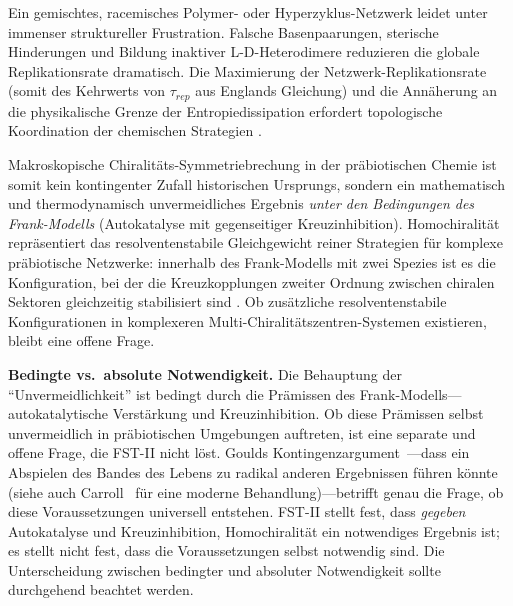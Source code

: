 \documentclass[12pt,a4paper]{article}
\theoremstyle{remark}
\begin{document}
Ein gemischtes, racemisches Polymer- oder Hyperzyklus-Netzwerk leidet unter immenser struktureller Frustration. Falsche Basenpaarungen, sterische Hinderungen und Bildung inaktiver L-D-Heterodimere reduzieren die globale Replikationsrate dramatisch. Die Maximierung der Netzwerk-Replikationsrate (somit des Kehrwerts von $\tau_{rep}$ aus Englands Gleichung) und die Ann\"aherung an die physikalische Grenze der Entropiedissipation erfordert topologische Koordination der chemischen Strategien \citep{Biochirality}.

Makroskopische Chiralit\"ats-Symmetriebrechung in der pr\"abiotischen Chemie ist somit kein kontingenter Zufall historischen Ursprungs, sondern ein mathematisch und thermodynamisch unvermeidliches Ergebnis \emph{unter den Bedingungen des Frank-Modells} (Autokatalyse mit gegenseitiger Kreuzinhibition). Homochiralit\"at repr\"asentiert das resolventenstabile Gleichgewicht reiner Strategien f\"ur komplexe pr\"abiotische Netzwerke: innerhalb des Frank-Modells mit zwei Spezies ist es die Konfiguration, bei der die Kreuzkopplungen zweiter Ordnung zwischen chiralen Sektoren gleichzeitig stabilisiert sind \citep{Biochirality}. Ob zus\"atzliche resolventenstabile Konfigurationen in komplexeren Multi-Chiralit\"atszentren-Systemen existieren, bleibt eine offene Frage.

\textbf{Bedingte vs.\ absolute Notwendigkeit.} Die Behauptung der ``Unvermeidlichkeit'' ist bedingt durch die Pr\"amissen des Frank-Modells---autokatalytische Verst\"arkung und Kreuzinhibition. Ob diese Pr\"amissen selbst unvermeidlich in pr\"abiotischen Umgebungen auftreten, ist eine separate und offene Frage, die FST-II nicht l\"ost. Goulds Kontingenzargument~\citep{Gould1989}---dass ein Abspielen des Bandes des Lebens zu radikal anderen Ergebnissen f\"uhren k\"onnte (siehe auch Carroll~\citep{UnbecomingBeing} f\"ur eine moderne Behandlung)---betrifft genau die Frage, ob diese Voraussetzungen universell entstehen. FST-II stellt fest, dass \emph{gegeben} Autokatalyse und Kreuzinhibition, Homochiralit\"at ein notwendiges Ergebnis ist; es stellt nicht fest, dass die Voraussetzungen selbst notwendig sind. Die Unterscheidung zwischen bedingter und absoluter Notwendigkeit sollte durchgehend beachtet werden.
\end{document}
